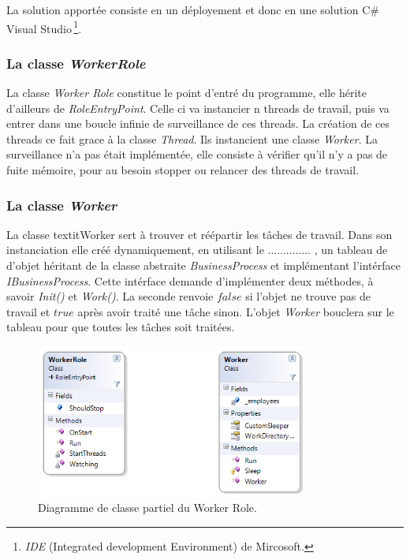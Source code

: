 La solution apportée consiste en un déployement et donc en une
solution C\# Visual Studio\,\footnote{\textit{IDE} (Integrated development
  Environment) de Mircosoft.}.




\subsubsection{La classe \textit{WorkerRole}}
La classe \textit{Worker Role} constitue le point d'entré du
programme, elle hérite d'ailleurs de \textit{RoleEntryPoint}. Celle ci
va instancier n threads de travail, puis va entrer dans une boucle
infinie de surveillance de ces threads. La création de ces threads ce
fait grace à la classe \textit{Thread}. Ils instancient une classe
\textit{Worker}. La surveillance n'a pas était implémentée, elle
consiste à vérifier qu'il n'y a pas de fuite mémoire, pour au besoin
stopper ou relancer des threads de travail. 


\subsubsection{La classe \textit{Worker}}
La classe textit{Worker} sert à trouver et réépartir les tâches de
travail. Dans son instanciation elle créé dynamiquement, en utilisant
le .............. , un tableau de d'objet héritant de la classe
abstraite \textit{BusinessProcess} et implémentant l'intérface
\textit{IBusinessProcess}. Cette intérface demande d'implémenter deux
méthodes, à savoir \textit{Init()} et \textit{Work()}. La seconde
renvoie $false$ si l'objet ne trouve pas de travail et $true$ après
avoir traité une tâche sinon. L'objet \textit{Worker} bouclera sur le
tableau pour que toutes les tâches soit traitées.

\begin{figure}[h!]
  \caption{Diagramme de classe partiel du Worker Role.}
  \centering
    \includegraphics[width=0.8\textwidth]{images/WorkerRole.png}
\end{figure}

